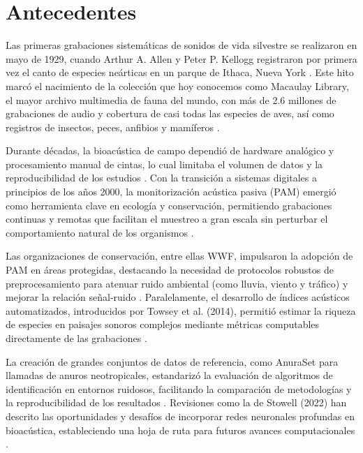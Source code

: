 \chapter{Antecedentes}\label{chapter: antecedentes}


Las primeras grabaciones sistemáticas de sonidos de vida 
silvestre se realizaron en mayo de 1929, cuando Arthur A. 
Allen y Peter P. Kellogg registraron por primera vez el canto 
de especies neárticas en un parque de Ithaca, Nueva York 
\cite{macaulaylibrary1929}. Este hito marcó el nacimiento de 
la colección que hoy conocemos como Macaulay Library, el 
mayor archivo multimedia de fauna del mundo, con más de 2.6 
millones de grabaciones de audio y cobertura de casi todas 
las especies de aves, así como registros de insectos, peces, 
anfibios y mamíferos \cite{allaboutbirds1929}.

Durante décadas, la bioacústica de campo dependió de hardware 
analógico y procesamiento manual de cintas, lo cual limitaba 
el volumen de datos y la reproducibilidad de los estudios 
\cite{blumstein2011acoustic}. Con la transición a sistemas digitales 
a principios de los años 2000, la monitorización acústica 
pasiva (PAM) emergió como herramienta clave en ecología y 
conservación, permitiendo grabaciones continuas y remotas que 
facilitan el muestreo a gran escala sin perturbar el 
comportamiento natural de los organismos \cite{acevedo2009automated}.

Las organizaciones de conservación, entre ellas WWF, 
impulsaron la adopción de PAM en áreas protegidas, 
destacando la necesidad de protocolos robustos de 
preprocesamiento para atenuar ruido ambiental (como lluvia, 
viento y tráfico) y mejorar la relación señal-ruido 
\cite{blumstein2011acoustic}. Paralelamente, el desarrollo de 
índices acústicos automatizados, introducidos por Towsey et 
al. (2014), permitió estimar la riqueza de especies en 
paisajes sonoros complejos mediante métricas computables 
directamente de las grabaciones \cite{towsey2014use}.

La creación de grandes conjuntos de datos de referencia, 
como AnuraSet para llamadas de anuros neotropicales, 
estandarizó la evaluación de algoritmos de identificación en 
entornos ruidosos, facilitando la comparación de metodologías 
y la reproducibilidad de los resultados 
\cite{canas2023dataset}. Revisiones como 
la de Stowell (2022) han descrito las oportunidades y 
desafíos de incorporar redes neuronales profundas en 
bioacústica, estableciendo una hoja de ruta para futuros 
avances computacionales \cite{stowell2022computational}.


